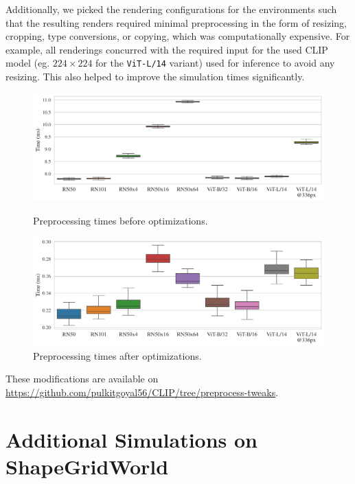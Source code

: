 Additionally, we picked the rendering configurations for the environments such that the resulting renders required minimal preprocessing in the form of resizing, cropping, type conversions, or copying, which was computationally expensive.
For example, all renderings concurred with the required input for the used CLIP model (eg. \(224 \times 224\) for the \texttt{ViT-L/14} variant) used for inference to avoid any resizing.
This also helped to improve the simulation times significantly.\\

\begin{figure}[H]
    \centering
    \includegraphics[width=\textwidth]{images/full_transform.pdf}
    \vspace{-12pt}
    \caption{Preprocessing times before optimizations.}
    \vspace{12pt}
    \includegraphics[width=\textwidth]{images/fast_transform.pdf}
    \vspace{-12pt}
    \caption{Preprocessing times after optimizations.}
    \label{fig:preprocessing-time-improvement}
\end{figure}

These modifications are available on \url{https://github.com/pulkitgoyal56/CLIP/tree/preprocess-tweaks}.



\chapter{Additional Simulations on ShapeGridWorld}
\label{sec:sgw-semantics-additional}


